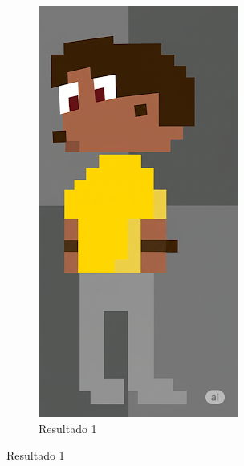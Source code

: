 \begin{figure}[htbp]
\begin{subfigure}{0.3\linewidth}
        \includegraphics[width=1\linewidth]{figs/geminiPro/chat5/tela4_res2.png}
        \caption{\small Resultado 1}
        \label{fig:geminiPro14a}
    \end{subfigure}

\end{figure}
